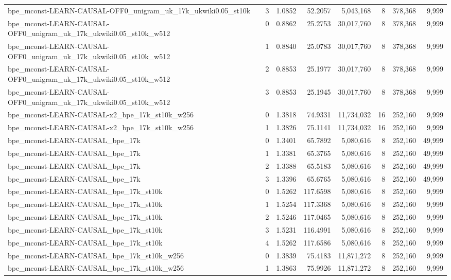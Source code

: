 \begin{tabular}{lrrrrrrr}
bpe\_mconst-LEARN-CAUSAL-OFF0\_unigram\_uk\_17k\_ukwiki0.05\_st10k & 3 & 1.0852 & 52.2057 & 5,043,168 & 8 & 378,368 & 9,999 \\
bpe\_mconst-LEARN-CAUSAL-OFF0\_unigram\_uk\_17k\_ukwiki0.05\_st10k\_w512 & 0 & 0.8862 & 25.2753 & 30,017,760 & 8 & 378,368 & 9,999 \\
bpe\_mconst-LEARN-CAUSAL-OFF0\_unigram\_uk\_17k\_ukwiki0.05\_st10k\_w512 & 1 & 0.8840 & 25.0783 & 30,017,760 & 8 & 378,368 & 9,999 \\
bpe\_mconst-LEARN-CAUSAL-OFF0\_unigram\_uk\_17k\_ukwiki0.05\_st10k\_w512 & 2 & 0.8853 & 25.1977 & 30,017,760 & 8 & 378,368 & 9,999 \\
bpe\_mconst-LEARN-CAUSAL-OFF0\_unigram\_uk\_17k\_ukwiki0.05\_st10k\_w512 & 3 & 0.8853 & 25.1945 & 30,017,760 & 8 & 378,368 & 9,999 \\
bpe\_mconst-LEARN-CAUSAL-x2\_bpe\_17k\_st10k\_w256 & 0 & 1.3818 & 74.9331 & 11,734,032 & 16 & 252,160 & 9,999 \\
bpe\_mconst-LEARN-CAUSAL-x2\_bpe\_17k\_st10k\_w256 & 1 & 1.3826 & 75.1141 & 11,734,032 & 16 & 252,160 & 9,999 \\
bpe\_mconst-LEARN-CAUSAL\_bpe\_17k & 0 & 1.3401 & 65.7892 & 5,080,616 & 8 & 252,160 & 49,999 \\
bpe\_mconst-LEARN-CAUSAL\_bpe\_17k & 1 & 1.3381 & 65.3765 & 5,080,616 & 8 & 252,160 & 49,999 \\
bpe\_mconst-LEARN-CAUSAL\_bpe\_17k & 2 & 1.3388 & 65.5183 & 5,080,616 & 8 & 252,160 & 49,999 \\
bpe\_mconst-LEARN-CAUSAL\_bpe\_17k & 3 & 1.3396 & 65.6765 & 5,080,616 & 8 & 252,160 & 49,999 \\
bpe\_mconst-LEARN-CAUSAL\_bpe\_17k\_st10k & 0 & 1.5262 & 117.6598 & 5,080,616 & 8 & 252,160 & 9,999 \\
bpe\_mconst-LEARN-CAUSAL\_bpe\_17k\_st10k & 1 & 1.5254 & 117.3368 & 5,080,616 & 8 & 252,160 & 9,999 \\
bpe\_mconst-LEARN-CAUSAL\_bpe\_17k\_st10k & 2 & 1.5246 & 117.0465 & 5,080,616 & 8 & 252,160 & 9,999 \\
bpe\_mconst-LEARN-CAUSAL\_bpe\_17k\_st10k & 3 & 1.5231 & 116.4991 & 5,080,616 & 8 & 252,160 & 9,999 \\
bpe\_mconst-LEARN-CAUSAL\_bpe\_17k\_st10k & 4 & 1.5262 & 117.6586 & 5,080,616 & 8 & 252,160 & 9,999 \\
bpe\_mconst-LEARN-CAUSAL\_bpe\_17k\_st10k\_w256 & 0 & 1.3839 & 75.4183 & 11,871,272 & 8 & 252,160 & 9,999 \\
bpe\_mconst-LEARN-CAUSAL\_bpe\_17k\_st10k\_w256 & 1 & 1.3863 & 75.9926 & 11,871,272 & 8 & 252,160 & 9,999 \\

\end{tabular}
